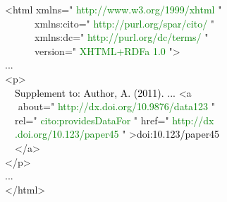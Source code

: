 \raggedright\small\ttfamily\frenchspacing
<html \textcolor{dccblue}{xmlns="}%
\textcolor{Green}{http://www.w3.org/1999/xhtml}%
\textcolor{dccblue}{"\\~~~~~~xmlns:cito="}%
\textcolor{Green}{http://purl.org/spar/cito/}%
\textcolor{dccblue}{"\\~~~~~~xmlns:dc="}%
\textcolor{Green}{http://purl.org/dc/terms/}%
\textcolor{dccblue}{"\\~~~~~~version="}%
\textcolor{Green}{XHTML+RDFa 1.0}%
\textcolor{dccblue}{"}>\\
\textcolor{black}{...}\\
<p>\\~~\textcolor{black}{Supplement to: Author, A. (2011). ... }<a\\~~%
\textcolor{dccblue}{about="}%
\textcolor{Green}{http://dx.doi.org/10.9876/data123}%
\textcolor{dccblue}{"\\~~rel="}%
\textcolor{Green}{cito:providesDataFor}%
\textcolor{dccblue}{" href="}%
\textcolor{Green}{http://dx\\~~.doi.org/10.123/paper45}%
\textcolor{dccblue}{"}%
>\textcolor{black}{doi:10.123/paper45}\\~~</a>\\</p>\\
\textcolor{black}{...}\\
</html>
